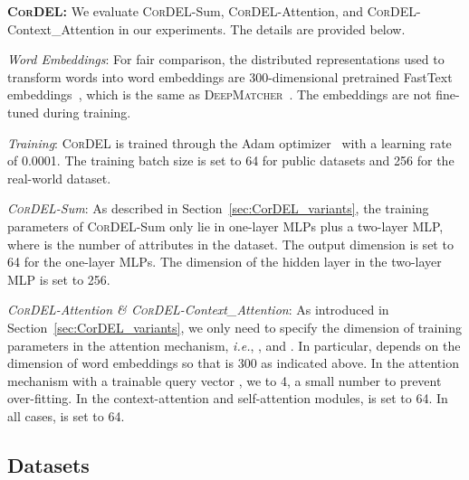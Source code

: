 \documentclass[conference]{IEEEtran}
\begin{document}
\textbf{\textsc{CorDEL}:} We evaluate \textsc{CorDEL}-Sum, \textsc{CorDEL}-Attention, and \textsc{CorDEL}-Context\_Attention in our experiments. The details are provided below.

\textit{Word Embeddings}: For fair comparison, the distributed representations used to transform words into word embeddings are 300-dimensional pretrained FastText embeddings~\cite{joulin2017bag}, which is the same as \textsc{DeepMatcher}~\cite{mudgal2018deep}. The embeddings are not fine-tuned during training.

\textit{Training}: \textsc{CorDEL} is trained through the Adam optimizer~\cite{kingma2014adam} with a learning rate of 0.0001. The training batch size is set to 64 for public datasets and 256 for the real-world dataset.

\textit{\textsc{CorDEL}-Sum}: As described in Section~\ref{sec:CorDEL_variants}, the training parameters of \textsc{CorDEL}-Sum only lie in  one-layer MLPs plus a two-layer MLP, where  is the number of attributes in the dataset. The output dimension is set to 64 for the  one-layer MLPs. The dimension of the hidden layer in the two-layer MLP is set to 256.

\textit{\textsc{CorDEL}-Attention \& \textsc{CorDEL}-Context\_Attention}: As introduced in Section~\ref{sec:CorDEL_variants}, we only need to specify the dimension of training parameters in the attention mechanism, \textit{i.e.}, ,  and . In particular,  depends on the dimension of word embeddings so that is 300 as indicated above. In the attention mechanism with a trainable query vector , we  to 4, a small number to prevent over-fitting. In the context-attention and self-attention modules,  is set to 64. In all cases,  is set to 64.

\subsection{Datasets}~\label{sec:datasets}
\end{document}
